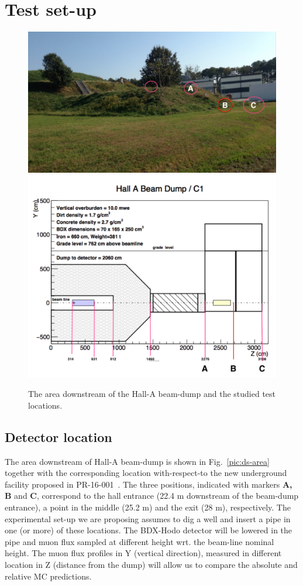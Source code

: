 \section{Test set-up}
\label{sec:setup}
\begin{figure}[h!] 
\center  
\includegraphics[width=11.5cm]{figs/ds-area.pdf}   
\includegraphics[width=11.5cm]{figs/test-plan.pdf}  
\caption{The area downstream of the Hall-A beam-dump and the studied test locations.}
\label{fig:ds-area}
\end{figure}

\subsection{Detector location}
The area downstream of Hall-A beam-dump is shown in Fig.~\ref{pic:ds-area}  together with the corresponding location with-respect-to  
the new  underground facility proposed in PR-16-001~\cite{bdx-proposal}. The three positions, indicated with markers {\bf A, B}  and {\bf C},  correspond to the hall entrance (22.4 m downstream of the beam-dump entrance), a point in the middle  (25.2 m) and the exit (28 m), respectively. The experimental set-up we are proposing  assumes to dig a well and insert a pipe in one (or more) of these locations. The BDX-Hodo detector will be lowered in the pipe and muon flux sampled at different height wrt. the beam-line nominal height. The muon flux profiles in Y (vertical direction), measured in  different location in Z (distance from the dump) will allow us to compare the absolute and relative MC predictions. 

